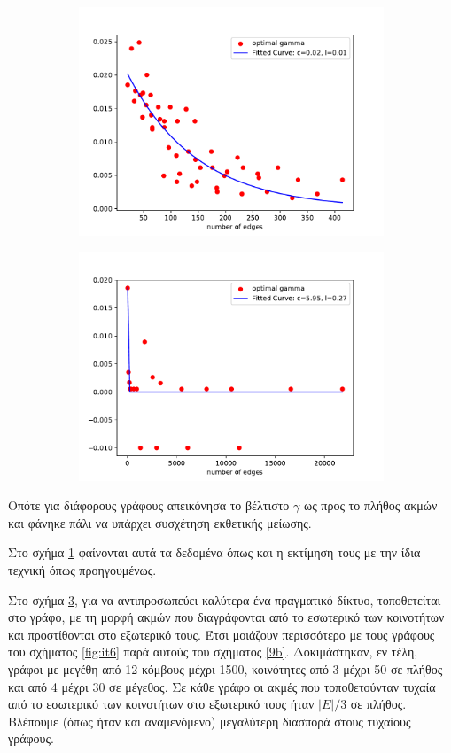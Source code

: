 \documentclass[12pt, letterpaper]{article}
\begin{document}
\begin{figure}
  \centering
  \begin{subfigure}{0.48\textwidth}
    \centering
    \includegraphics[width=0.6\linewidth]{EDGES_GAMMA_FIT.pdf}
    \caption{}
    \label{EDGESFIT}
  \end{subfigure}
  \begin{subfigure}{0.48\textwidth}
    \centering
    \includegraphics[width=0.6\linewidth]{EDGES_GAMMA_FIT_noise.pdf}
    \caption{}
    \label{EDGESFIT_noise}
  \end{subfigure}
\end{figure}

Οπότε για διάφορους γράφους απεικόνησα το βέλτιστο $\gamma$ ως προς το πλήθος ακμών και 
φάνηκε πάλι να υπάρχει συσχέτηση εκθετικής μείωσης. 

Στο σχήμα \ref{EDGESFIT} φαίνονται αυτά τα δεδομένα όπως και η εκτίμηση τους με την 
ίδια τεχνική όπως προηγουμένως. 

Στο σχήμα \ref{EDGESFIT_noise}, για να αντιπροσωπεύει καλύτερα ένα πραγματικό δίκτυο,
τοποθετείται  στο γράφο, με τη μορφή ακμών που διαγράφονται από το 
εσωτερικό των κοινοτήτων και προστίθονται στο εξωτερικό τους. Έτσι μοιάζουν περισσότερο
με τους γράφους του σχήματος \ref{fig:it6} παρά αυτούς του σχήματος \ref{9b}. 
Δοκιμάστηκαν, εν τέλη, γράφοι με μεγέθη από 12 κόμβους μέχρι 1500, κοινότητες
από 3 μέχρι 50 σε πλήθος και από 4 μέχρι 30 σε μέγεθος. Σε κάθε γράφο 
οι ακμές που τοποθετούνταν τυχαία από το εσωτερικό των κοινοτήτων στο εξωτερικό τους 
ήταν $|E|/3$ σε πλήθος. Βλέπουμε (όπως ήταν και αναμενόμενο) μεγαλύτερη διασπορά 
στους τυχαίους γράφους. 
\end{document}
